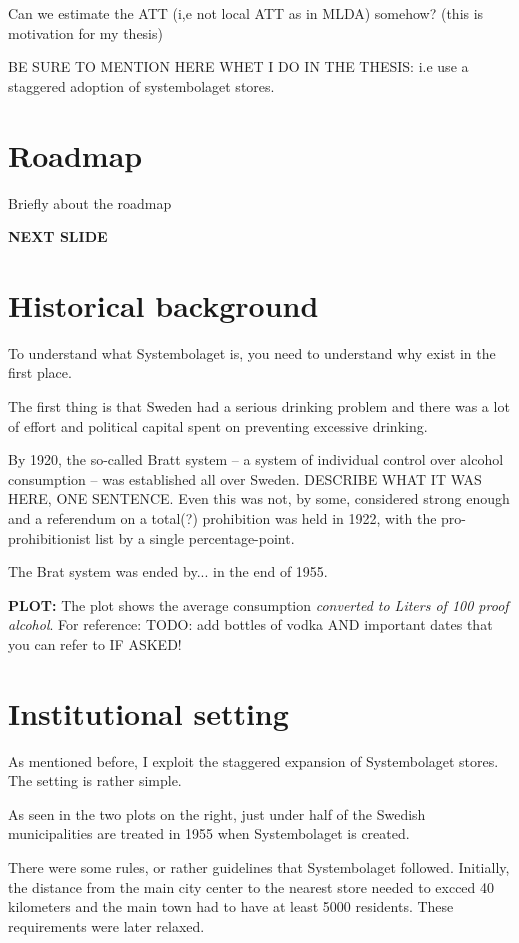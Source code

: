 \documentclass[12pt]{article}
\begin{document}
Can we estimate the ATT (i,e not local ATT as in MLDA) somehow? (this is motivation for my thesis)

BE SURE TO MENTION HERE WHET I DO IN THE THESIS: i.e use a staggered adoption of systembolaget stores.


\section{Roadmap}

Briefly about the roadmap

\textbf{NEXT SLIDE}

\section{Historical background}
To understand what Systembolaget is, you need to understand why exist in the first place. 

The first thing is that Sweden had a serious drinking problem and there was a lot of effort and political capital spent on preventing excessive drinking.

By 1920, the so-called Bratt system -- a system of individual control over alcohol consumption -- was established all over Sweden. DESCRIBE WHAT IT WAS HERE, ONE SENTENCE. Even this was not, by some, considered strong enough and a referendum on a total(?) prohibition was held in 1922, with the pro-prohibitionist list by a single percentage-point.

The Brat system was ended by... in the end of 1955.



 \textbf{PLOT:} The plot shows the average consumption \emph{ converted to Liters of 100 proof alcohol}. For reference: TODO: add bottles of vodka AND important dates that you can refer to IF ASKED!

 \section{Institutional setting}
 As mentioned before, I exploit the staggered expansion of Systembolaget stores. The setting is rather simple. 

 As seen in the two plots on the right, just under half of the Swedish municipalities are treated in 1955 when Systembolaget is created.

 There were some rules, or rather guidelines that Systembolaget followed. Initially, the distance from the main city center to the nearest store needed to excced 40 kilometers and the main town had to have at least 5000 residents. These requirements were later relaxed.
\end{document}
